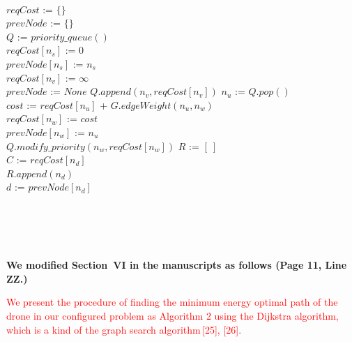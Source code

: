 \documentclass[onecolumn]{IEEEconf}
\let\oldnl\nl%
\newcommand{\nonl}{\renewcommand{\nl}{\let\nl\oldnl}}
\begin{document}
\begin{description}
\begin{algorithm}[h]
{    }
    \nonl \hrulefill \\
    $reqCost$ := $\{\}$  \\
    $prevNode$ := $\{\}$ \\
    $Q$ := $priority\_queue()$ \\
    $reqCost[n_s]$ := 0 \\
    $prevNode[n_s]$ := $n_s$ \\
    {
        {
            $reqCost[n_v]$ := $\infty$ \\
            $prevNode$ := $None$
        }
        $Q.append(n_v, reqCost[n_v])$
    }
    {
	    $n_u$ := $Q.pop()$ \\
        { 
    	    $cost$ := $reqCost[n_u]$ + $G.edgeWeight(n_u, n_w)$ \\
    	    {
    	        $reqCost[n_w]$ := $cost$ \\
    	        $prevNode[n_w]$ := $n_u$ \\
    	        $Q.modify\_priority(n_w, reqCost[n_w])$
    	    }
        }
    }
    $R$ := $[\ ]$ \\
    $C$ := $reqCost[n_d]$ \\ 
    {
    $R.append(n_d)$ \\
    $d$ := $prevNode[n_d]$
    }
    \end{algorithm}
    \SetNlSty{}{\color{black}}{:}
    \SetAlFnt{\color{black}}
    ~\\
    ~\\
    ~\\
    \pagebreak ~\\
	\textbf{We modified Section~VI in the manuscripts as follows (Page 11, Line ZZ.)}\\
    \begin{mdframed}[ linewidth=.75pt, userdefinedwidth=0.9\textwidth]
    \textcolor{red}{
    We present the procedure of finding the minimum energy optimal path of the drone in our configured problem as Algorithm 2 using the Dijkstra algorithm, which is a kind of the graph search algorithm\,[25], [26].
}
\end{mdframed}
\end{description}
\end{document}
